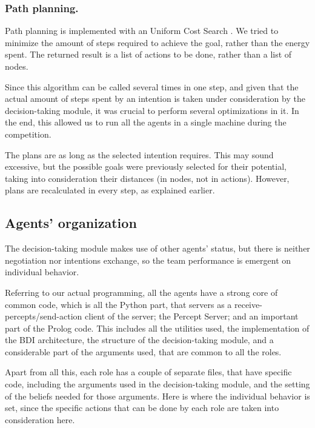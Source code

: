 \documentclass{llncs2e/llncs}
\begin{document}
\subsubsection{Path planning.}

    Path planning is implemented with an Uniform Cost Search
    \cite{Russell:2003:AIM:773294}.  We tried to minimize the amount of
    steps required to achieve the goal, rather than the energy spent.  The
    returned result is a list of actions to be done, rather than a list of
    nodes.
    
    Since this algorithm can be called several times in one step, and given that the 
    actual amount of steps spent by an intention is taken under consideration by 
    the decision-taking module, it was crucial to perform several optimizations in 
    it. In the end, this allowed us to run all the agents in a single machine  
    during the competition.
    
    The plans are as long as the selected intention requires. This may 
    sound excessive, but the possible goals were previously selected for their 
    potential, taking into consideration their distances (in nodes, not in 
    actions). However, plans are recalculated in every step, as explained earlier.    

\subsection{Agents' organization}

    The decision-taking module makes use of other agents' status, but there is
    neither negotiation nor intentions exchange, so the team performance is
    emergent on individual behavior.  
    
    Referring to our actual programming, all the agents have a strong core of
    common code, which is all the Python part, that servers as
    a receive-percepts/send-action client of the server; the Percept Server; and
    an important part of the Prolog code. This includes all the utilities used,
    the implementation of the BDI architecture, the structure of the
    decision-taking module, and a considerable part of the arguments used, that
    are common to all the roles.
        
    Apart from all this, each role has a couple of separate files, that have 
    specific code, including the arguments used in the decision-taking module, and
    the setting of the beliefs needed for those arguments. Here is where the 
    individual behavior is set, since the specific actions that can be done by each
    role are taken into consideration here.
    
\end{document}
